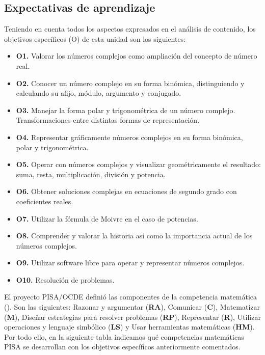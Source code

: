\documentclass[../main.tex]{memoir}
\begin{document}
\subsection{Expectativas de aprendizaje}

Teniendo en cuenta todos los aspectos expresados en el análisis de contenido, los objetivos específicos (O) de esta unidad son los siguientes:

\begin{itemize}
	\item \textbf{O1.} Valorar los números complejos como ampliación del concepto de número real.
	\item \textbf{O2.} Conocer un número complejo en su forma binómica, distinguiendo y calculando su afijo, módulo, argumento y conjugado.
	\item \textbf{O3.} Manejar la forma polar y trigonométrica de un número complejo. Transformaciones entre distintas formas de representación.
	\item \textbf{O4.} Representar gráficamente números complejos en su forma binómica, polar y trigonométrica.
	\item \textbf{O5.} Operar con números complejos y visualizar geométricamente el resultado: suma, resta, multiplicación, división y potencia.
	\item \textbf{O6.} Obtener soluciones complejas en ecuaciones de segundo grado con coeficientes reales.
	\item \textbf{O7.} Utilizar la fórmula de Moivre en el caso de potencias.
	\item \textbf{O8.} Comprender y valorar la historia así como la importancia actual de los números complejos.
	\item \textbf{O9.} Utilizar software libre para operar y representar números complejos.
	\item \textbf{O10.} Resolución de problemas.
\end{itemize}

El proyecto PISA/OCDE definió las componentes de la competencia matemática (\cite{pisaocde}). Son las siguientes: Razonar y argumentar (\textbf{RA}), Comunicar (\textbf{C}), Matematizar (\textbf{M}), Diseñar estrategias para resolver problemas (\textbf{RP}), Representar (\textbf{R}), Utilizar operaciones y lenguaje simbólico (\textbf{LS}) y Usar herramientas matemáticas (\textbf{HM}). \\

Por todo ello, en la siguiente tabla indicamos qué competencias matemáticas PISA se desarrollan con los objetivos específicos anteriormente comentados.
\end{document}
